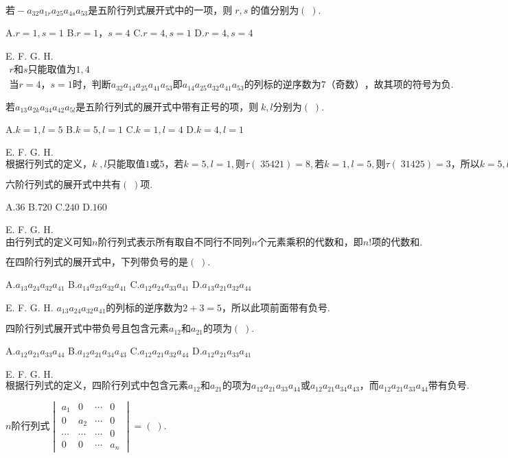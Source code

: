 $若-a_{32}a_{1r}a_{25}a_{4s}a_{53}\mathrm{是五阶行列式展开式中的一项}，则\;r,s\;\mathrm{的值分别为}(\;).$

A.$r=1,s=1$   B.$r=1，s=4$   C.$r=4,s=1$   D.$r=4,s=4$

E.   F.   G.   H.
$\begin{array}{l}r和s\mathrm{只能取值为}1,4\\当r=4，s=1时，\mathrm{判断}a_{32}a_{14}a_{25}a_{41}a_{53}即a_{14}a_{25}a_{32}a_{41}a_{53}\mathrm{的列标的逆序数为}7（\mathrm{奇数}），\mathrm{故其项的符号为负}.\end{array}$


$若a_{13}a_{2k}a_{34}a_{42}a_{5l}\mathrm{是五阶行列式的展开式中带有正号的项}，则\;k,l\mathrm{分别为}(\;).$

A.$k=1,l=5$   B.$k=5,l=1$   C.$k=1,l=4$   D.$k=4,l=1$

E.   F.   G.   H.
$\mathrm{根据行列式的定义}，k\;,l\mathrm{只能取值}1或5，若k=5,l=1,则\tau(\;35421)=8,若k=1,l=5,则\tau(\;31425)=3，\mathrm{所以}k=5,l=1.$


$\mathrm{六阶行列式的展开式中共有}(\;)项.$

A.$36$   B.$720$   C.$240$   D.$160$

E.   F.   G.   H.
$\mathrm{由行列式的定义可知}n\mathrm{阶行列式表示所有取自不同行不同列}n\mathrm{个元素乘积的代数和}，即n!\mathrm{项的代数和}.$


$\mathrm{在四阶行列式的展开式中}，\mathrm{下列带负号的是}(\;).$

A.$a_{13}a_{24}a_{32}a_{41}$   B.$a_{14}a_{23}a_{32}a_{41}$   C.$a_{12}a_{24}a_{33}a_{41}$   D.$a_{13}a_{21}a_{32}a_{44}$

E.   F.   G.   H.
$a_{13}a_{24}a_{32}a_{41}\mathrm{的列标的逆序数为}2+3=5，\mathrm{所以此项前面带有负号}.$


$\mathrm{四阶行列式展开式中带负号且包含元素}a_{12}和a_{21}\mathrm{的项为}(\;).$

A.$a_{12}a_{21}a_{33}a_{44}$   B.$a_{12}a_{21}a_{34}a_{43}$   C.$a_{12}a_{21}a_{32}a_{44}$   D.$a_{12}a_{21}a_{33}a_{41}$

E.   F.   G.   H.
$\mathrm{根据行列式的定义}，\mathrm{四阶行列式中包含元素}a_{12}和a_{21}\mathrm{的项为}a_{12}a_{21}a_{33}a_{44}或a_{12}a_{21}a_{34}a_{43}，而a_{12}a_{21}a_{33}a_{44}\mathrm{带有负号}.$


$n\mathrm{阶行列式}\begin{vmatrix}a_1&0&\cdots&0\\0&a_2&\cdots&0\\\cdots&\cdots&\cdots&0\\0&0&\cdots&a_n\end{vmatrix}=(\;).$


